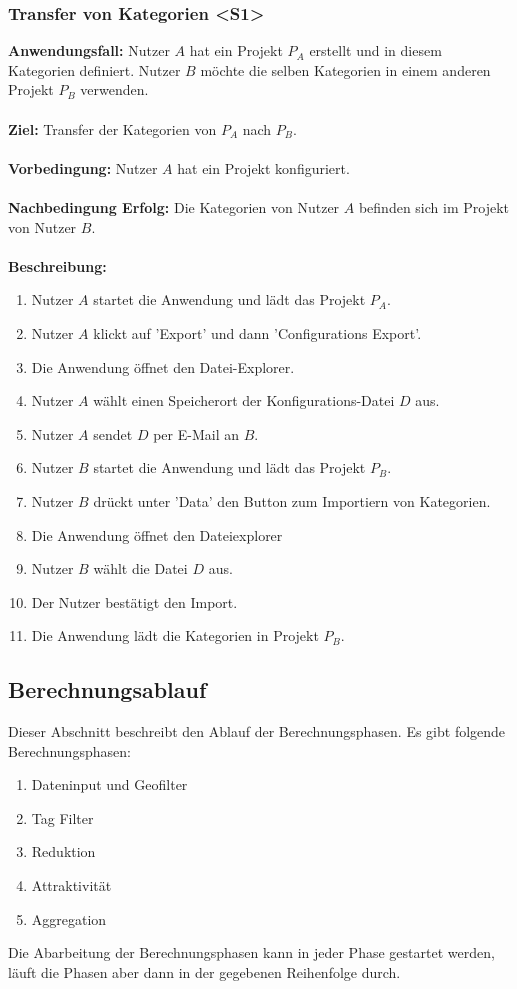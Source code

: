 \documentclass[parskip=full]{scrartcl} %
\begin{document}
\subsubsection*{Transfer von Kategorien <S1>}
\textbf{Anwendungsfall:} Nutzer $A$ hat ein Projekt $P_A$ erstellt und in diesem Kategorien definiert. Nutzer $B$ möchte die selben Kategorien in einem anderen Projekt $P_B$ verwenden.\\\\
\textbf{Ziel:} Transfer der Kategorien von $P_A$ nach $P_B$.\\\\
\textbf{Vorbedingung:} Nutzer $A$ hat ein Projekt konfiguriert.\\\\
\textbf{Nachbedingung Erfolg:} Die Kategorien von Nutzer $A$ befinden sich im Projekt von Nutzer $B$.\\\\
\textbf{Beschreibung:}
\begin{enumerate}
    \item Nutzer $A$ startet die Anwendung und lädt das Projekt $P_A$.
    \item Nutzer $A$ klickt auf 'Export' und dann 'Configurations Export'.
    \item Die Anwendung öffnet den Datei-Explorer.
    \item Nutzer $A$ wählt einen Speicherort der Konfigurations-Datei $D$ aus.
    \item Nutzer $A$ sendet $D$ per E-Mail an $B$.
    \item Nutzer $B$ startet die Anwendung und lädt das Projekt $P_B$.
    \item Nutzer $B$ drückt unter 'Data' den Button zum Importiern von Kategorien.
    \item Die Anwendung öffnet den Dateiexplorer
    \item Nutzer $B$ wählt die Datei $D$ aus.
    \item Der Nutzer bestätigt den Import.
    \item Die Anwendung lädt die Kategorien in Projekt $P_B$.
\end{enumerate}
\newpage






\subsection{Berechnungsablauf} \hypertarget{calculations}{}
Dieser Abschnitt beschreibt den Ablauf der Berechnungsphasen. Es gibt folgende Berechnungsphasen:
\begin{enumerate}
    \item Dateninput und Geofilter
    \item Tag Filter
    \item Reduktion
    \item Attraktivität
    \item Aggregation
\end{enumerate}
Die Abarbeitung der Berechnungsphasen kann in jeder Phase gestartet werden, läuft die Phasen aber dann in der gegebenen Reihenfolge durch.
\end{document}
